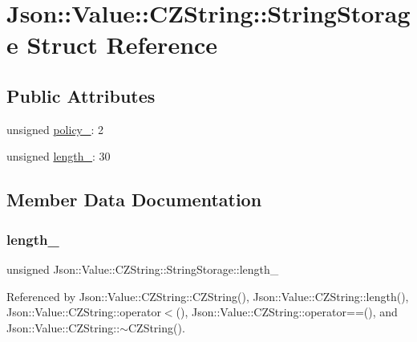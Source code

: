 \hypertarget{structJson_1_1Value_1_1CZString_1_1StringStorage}{}\section{Json\+:\+:Value\+:\+:C\+Z\+String\+:\+:String\+Storage Struct Reference}
\label{structJson_1_1Value_1_1CZString_1_1StringStorage}
\subsection*{Public Attributes}
\begin{DoxyCompactItemize}
\item 
unsigned \hyperlink{structJson_1_1Value_1_1CZString_1_1StringStorage_a7f68c8d6197c5692a525854b5f29f87b_a7f68c8d6197c5692a525854b5f29f87b}{policy\+\_\+}\+: 2
\item 
unsigned \hyperlink{structJson_1_1Value_1_1CZString_1_1StringStorage_a165d865c44e6471d34668eeb4f15b140_a165d865c44e6471d34668eeb4f15b140}{length\+\_\+}\+: 30
\end{DoxyCompactItemize}


\subsection{Member Data Documentation}
\mbox{\label{structJson_1_1Value_1_1CZString_1_1StringStorage_a165d865c44e6471d34668eeb4f15b140_a165d865c44e6471d34668eeb4f15b140}} 
\subsubsection{\texorpdfstring{length\+\_\+}{length\_}}
{\footnotesize\ttfamily unsigned Json\+::\+Value\+::\+C\+Z\+String\+::\+String\+Storage\+::length\+\_\+}



Referenced by Json\+::\+Value\+::\+C\+Z\+String\+::\+C\+Z\+String(), Json\+::\+Value\+::\+C\+Z\+String\+::length(), Json\+::\+Value\+::\+C\+Z\+String\+::operator$<$(), Json\+::\+Value\+::\+C\+Z\+String\+::operator==(), and Json\+::\+Value\+::\+C\+Z\+String\+::$\sim$\+C\+Z\+String().

